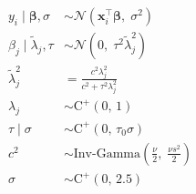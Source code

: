 \documentclass[border=6pt]{standalone}
\begin{document}
\begin{minipage}{7cm}
\setlength{\jot}{6pt}
\begin{align*}
  y_i \mid \boldsymbol{\beta}, \sigma
    &\sim \mathcal{N}\!\left(\mathbf{x}_i^\top \boldsymbol{\beta},\; \sigma^2\right) \\
  \beta_j \mid \tilde{\lambda}_j, \tau
    &\sim \mathcal{N}\!\left(0,\; \tau^2 \tilde{\lambda}_j^2\right) \\
  \tilde{\lambda}_j^2
    &= \frac{c^2 \lambda_j^2}{c^2 + \tau^2 \lambda_j^2} \\
  \lambda_j
    &\sim \mathrm{C}^{+}(0,\,1) \\
  \tau \mid \sigma
    &\sim \mathrm{C}^{+}(0,\,\tau_0 \sigma) \\
  c^2
    &\sim \mathrm{Inv\text{-}Gamma}\!\left(\tfrac{\nu}{2},\;\tfrac{\nu s^2}{2}\right) \\
  \sigma
    &\sim \mathrm{C}^{+}(0,\,2.5)
\end{align*}
\end{minipage}
\end{document}
